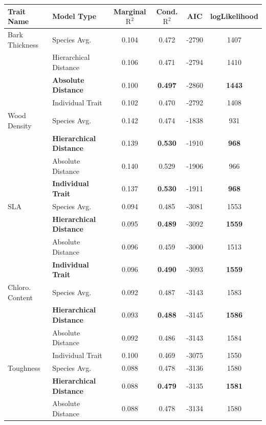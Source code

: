 \begin{table}[!t]
	\begin{center}
		\begin{tabular}{llcccc}
		  \hline
		  \hline
		 Trait Name & Model Type & Marginal $\text{R}^2$ & Cond. $\text{R}^2$ & AIC & logLikelihood \\ 
		  \hline
		Bark Thickness & Species Avg. & 0.104 & 0.472 & -2790 & 1407 \\ 
		            & Hierarchical Distance & 0.106 & 0.471 & -2794 & 1410 \\ 
		            & \textbf{Absolute Distance} & 0.100 & \textbf{0.497} & -2860 & \textbf{1443} \\ 
		            & Individual Trait & 0.102 & 0.470 & -2792 & 1408 \\ 
		  Wood Density & Species Avg. & 0.142 & 0.474 & -1838 & 931 \\ 
		               & \textbf{Hierarchical Distance} & 0.139 & \textbf{0.530} & -1910 & \textbf{968} \\ 
		               & Absolute Distance & 0.140 & 0.529 & -1906 & 966 \\ 
		               & \textbf{Individual Trait} & 0.137 & \textbf{0.530} & -1911 & \textbf{968} \\ 
		  SLA & Species Avg. & 0.094 & 0.485 & -3081 & 1553 \\ 
		      & \textbf{Hierarchical Distance} & 0.095 & \textbf{0.489} & -3092 & \textbf{1559} \\ 
		      & Absolute Distance & 0.096 & 0.459 & -3000 & 1513 \\ 
		      & \textbf{Individual Trait} & 0.096 & \textbf{0.490} & -3093 & \textbf{1559} \\ 
		  Chloro. Content & Species Avg. & 0.092 & 0.487 & -3143 & 1583 \\ 
		                  & \textbf{Hierarchical Distance} & 0.093 & \textbf{0.488} & -3145 & \textbf{1586} \\ 
		                  & Absolute Distance & 0.092 & 0.486 & -3143 & 1584 \\ 
		                  & Individual Trait & 0.100 & 0.469 & -3075 & 1550 \\ 
		  Toughness & Species Avg. & 0.088 & 0.478 & -3136 & 1580 \\ 
		            & \textbf{Hierarchical Distance} & 0.088 & \textbf{0.479} & -3135 & \textbf{1581} \\ 
		            & Absolute Distance & 0.088 & 0.478 & -3134 & 1580 \\ 

\end{tabular}
\end{center}
\end{table}
